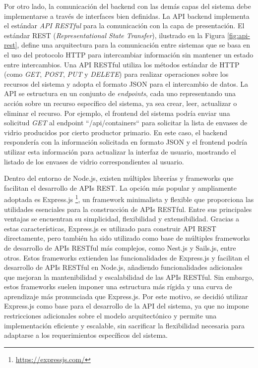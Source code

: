Por otro lado, la comunicación del backend con las demás capas del sistema debe implementarse a través de interfaces bien definidas. La API backend implementa el estándar \textit{API RESTful} para la comunicación con la capa de presentación. El estándar REST (\textit{Representational State Transfer}), ilustrado en la Figura \ref{fig:api-rest}, define una arquitectura para la comunicación entre sistemas que se basa en el uso del protocolo HTTP para intercambiar información sin mantener un estado entre intercambios. Una API RESTful utiliza los métodos estándar de HTTP (como \textit{GET}, \textit{POST}, \textit{PUT} y \textit{DELETE}) para realizar operaciones sobre los recursos del sistema y adopta el formato JSON para el intercambio de datos. La API se estructura en un conjunto de \textit{endpoints}, cada uno representando una acción sobre un recurso específico del sistema, ya sea crear, leer, actualizar o eliminar el recurso. Por ejemplo, el frontend del sistema podría enviar una solicitud \textit{GET} al endpoint ``/api/containers`` para solicitar la lista de envases de vidrio producidos por cierto productor primario. En este caso, el backend respondería con la información solicitada en formato JSON y el frontend podría utilizar esta información para actualizar la interfaz de usuario, mostrando el listado de los envases de vidrio correspondientes al usuario.

Dentro del entorno de Node.js, existen múltiples librerías y frameworks que facilitan el desarrollo de APIs REST. La opción más popular y ampliamente adoptada es Express.js \footnote{\url{https://expressjs.com/}}, un framework minimalista y flexible que proporciona las utilidades esenciales para la construcción de APIs RESTful. Entre sus principales ventajas se encuentran su simplicidad, flexibilidad y extensibilidad. Gracias a estas características, Express.js es utilizado para construir API REST directamente, pero también ha sido utilizado como base de múltiples frameworks de desarrollo de APIs RESTful más complejos, como Nest.js y Sails.js, entre otros. Estos frameworks extienden las funcionalidades de Express.js y facilitan el desarrollo de APIs RESTful en Node.js, añadiendo funcionalidades adicionales que mejoran la mantenibilidad y escalabilidad de las APIs RESTful. Sin embargo, estos frameworks suelen imponer una estructura más rígida y una curva de aprendizaje más pronunciada que Express.js. Por este motivo, se decidió utilizar Express.js como base para el desarrollo de la API del sistema, ya que no impone restricciones adicionales sobre el modelo arquitectónico y permite una implementación eficiente y escalable, sin sacrificar la flexibilidad necesaria para adaptarse a los requerimientos específicos del sistema.

